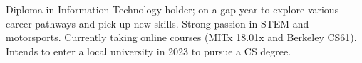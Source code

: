 

\begin{cvparagraph}

Diploma in Information Technology holder; on a gap year to explore various career pathways and pick up new skills. Strong passion in STEM and motorsports. 
Currently taking online courses (MITx 18.01x and Berkeley CS61). Intends to enter a local university in 2023 to pursue a CS degree. 
\end{cvparagraph}
